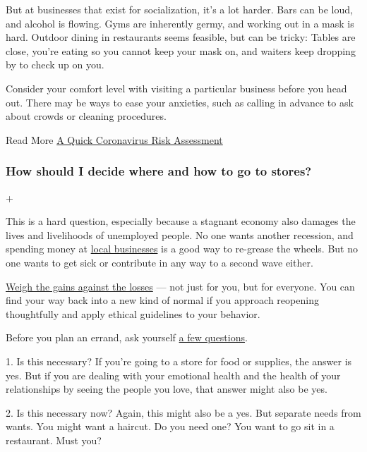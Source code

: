 But at businesses that exist for socialization, it's a lot harder. Bars
can be loud, and alcohol is flowing. Gyms are inherently germy, and
working out in a mask is hard. Outdoor dining in restaurants seems
feasible, but can be tricky: Tables are close, you're eating so you
cannot keep your mask on, and waiters keep dropping by to check up on
you.

Consider your comfort level with visiting a particular business before
you head out. There may be ways to ease your anxieties, such as calling
in advance to ask about crowds or cleaning procedures.

 Read More
\href{https://www.nytimes3xbfgragh.onion/interactive/2020/06/03/burst/coronavirus-risk-gym-surfaces-bike.html}{A
Quick Coronavirus Risk Assessment}

\hypertarget{how-should-i-decide-where-and-how-to-go-to-stores}{%
\subsubsection{How should I decide where and how to go to
stores?}\label{how-should-i-decide-where-and-how-to-go-to-stores}}

+

This is a hard question, especially because a stagnant economy also
damages the lives and livelihoods of unemployed people. No one wants
another recession, and spending money at
\href{https://www.nytimes3xbfgragh.onion/2020/06/18/business/small-business-reopening-coronavirus.html}{local
businesses} is a good way to re-grease the wheels. But no one wants to
get sick or contribute in any way to a second wave either.

\href{https://www.nytimes3xbfgragh.onion/2020/04/08/dining/takeout-restaurant-ethics-coronavirus.html}{Weigh
the gains against the losses} --- not just for you, but for everyone.
You can find your way back into a new kind of normal if you approach
reopening thoughtfully and apply ethical guidelines to your behavior.

Before you plan an errand, ask yourself
\href{https://www.nytimes3xbfgragh.onion/interactive/2020/05/06/opinion/coronavirus-us-reopen.html}{a
few questions}.

1. Is this necessary? If you're going to a store for food or supplies,
the answer is yes. But if you are dealing with your emotional health and
the health of your relationships by seeing the people you love, that
answer might also be yes.

2. Is this necessary now? Again, this might also be a yes. But separate
needs from wants. You might want a haircut. Do you need one? You want to
go sit in a restaurant. Must you?

